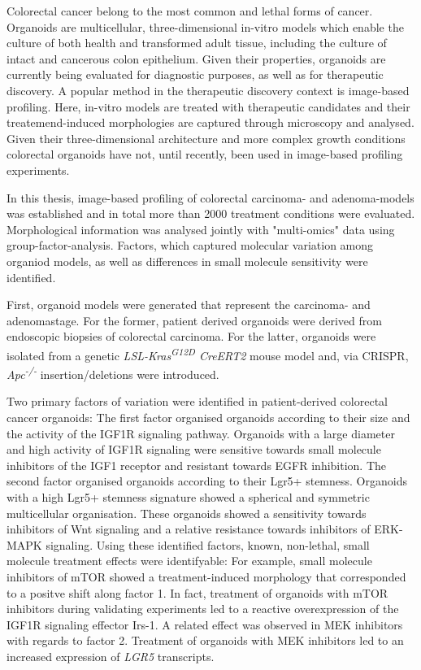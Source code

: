 Colorectal cancer belong to the most common and lethal forms of cancer. Organoids are multicellular, three-dimensional in-vitro models which enable the culture of both health and transformed adult tissue, including the culture of intact and cancerous colon epithelium. Given their properties, organoids are currently being evaluated for diagnostic purposes, as well as for therapeutic discovery. A popular method in the therapeutic discovery context is image-based profiling. Here, in-vitro models are treated with therapeutic candidates and their treatemend-induced morphologies are captured through microscopy and analysed. Given their three-dimensional architecture and more complex growth conditions colorectal organoids have not, until recently, been used in image-based profiling experiments.
\bigbreak

In this thesis, image-based profiling of colorectal carcinoma- and adenoma-models was established and in total more than 2000 treatment conditions were evaluated. Morphological information was analysed jointly with "multi-omics" data using group-factor-analysis. Factors, which captured molecular variation among organiod models, as well as differences in small molecule sensitivity were identified.
\bigbreak

First, organoid models were generated that represent the carcinoma- and adenomastage. For the former, patient derived organoids were derived from endoscopic biopsies of colorectal carcinoma. For the latter, organoids were isolated from a genetic \textit{LSL-Kras\textsuperscript{G12D} CreERT2} mouse model and, via CRISPR, \textit{Apc\textsuperscript{-/-}} insertion/deletions were introduced.
\bigbreak

Two primary factors of variation were identified in patient-derived colorectal cancer organoids: The first factor organised organoids according to their size and the activity of the IGF1R signaling pathway. Organoids with a large diameter and high activity of IGF1R signaling were sensitive towards small molecule inhibitors of the IGF1 receptor and resistant towards EGFR inhibition. 
\smallbreak
The second factor organised organoids according to their Lgr5+ stemness. Organoids with a high Lgr5+ stemness signature showed a spherical and symmetric multicellular organisation. These organoids showed a sensitivity towards inhibitors of Wnt signaling and a relative resistance towards inhibitors of ERK-MAPK signaling.
\smallbreak
Using these identified factors, known, non-lethal, small molecule treatment effects were identifyable: For example, small molecule inhibitors of mTOR showed a treatment-induced morphology that corresponded to a positve shift along factor 1. In fact, treatment of organoids with mTOR inhibitors during validating experiments led to a reactive overexpression of the IGF1R signaling effector Irs-1. A related effect was observed in MEK inhibitors with regards to factor 2. Treatment of organoids with MEK inhibitors led to an increased expression of \textit{LGR5} transcripts.
\bigbreak

